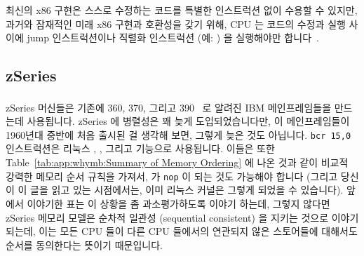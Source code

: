 최신의 x86 구현은 스스로 수정하는 코드를 특별한 인스트럭션 없이 수용할 수
있지만, 과거와 잠재적인 미래 x86 구현과 호환성을 갖기 위해, CPU 는 코드의
수정과 실행 사이에 jump 인스트럭션이나 직렬화 인스트럭션 (예: ) 을
실행해야만 합니다~\cite[Section 8.1.3]{Intel64IA32v3A2011}.

\subsection{zSeries}

zSeries 머신들은 기존에 360, 370, 그리고 390~\cite{IBMzSeries04a} 로 알려진
IBM\textsuperscript{\texttrademark} 메인프레임들을 만드는데 사용됩니다.
zSeries 에 병렬성은 꽤 늦게 도입되었습니다만, 이 메인프레임들이 1960년대 중반에
처음 출시된 걸 생각해 보면, 그렇게 늦은 것도 아닙니다.
{\tt bcr 15,0} 인스트럭션은 리눅스 , , 그리고
 기능으로 사용됩니다.
이들은 또한 Table~\ref{tab:app:whymb:Summary of Memory Ordering} 에 나온 것과
같이 비교적 강력한 메모리 순서 규칙을 가져서,  가 {\tt nop} 이
되는 것도 가능해야 합니다 (그리고 당신이 이 글을 읽고 있는 시점에서는, 이미
리눅스 커널은 그렇게 되었을 수 있습니다).
앞에서 이야기한 표는 이 상황을 좀 과소평가하도록 이야기 하는데, 그렇지 않다면
zSeries 메모리 모델은 순차적 일관성 (sequential consistent) 을 지키는 것으로
이야기 되는데, 이는 모든 CPU 들이 다른 CPU 들에서의 연관되지 않은 스토어들에
대해서도 순서를 동의한다는 뜻이기 때문입니다.

